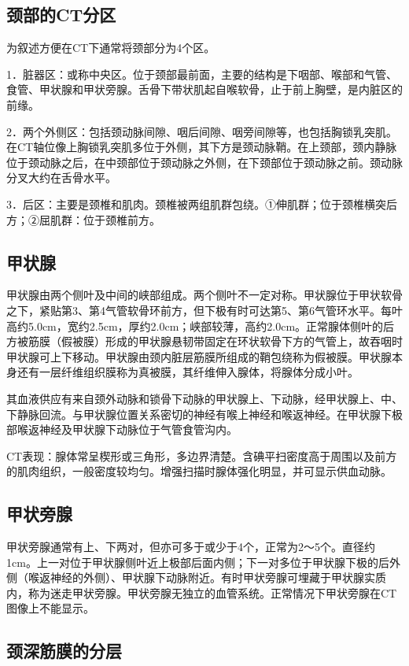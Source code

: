 \subsection{颈部的CT分区}

为叙述方便在CT下通常将颈部分为4个区。

1．脏器区：或称中央区。位于颈部最前面，主要的结构是下咽部、喉部和气管、食管、甲状腺和甲状旁腺。舌骨下带状肌起自喉软骨，止于前上胸壁，是内脏区的前缘。

2．两个外侧区：包括颈动脉间隙、咽后间隙、咽旁间隙等，也包括胸锁乳突肌。在CT轴位像上胸锁乳突肌多位于外侧，其下方是颈动脉鞘。在上颈部，颈内静脉位于颈动脉之后，在中颈部位于颈动脉之外侧，在下颈部位于颈动脉之前。颈动脉分叉大约在舌骨水平。

3．后区：主要是颈椎和肌肉。颈椎被两组肌群包绕。①伸肌群；位于颈椎横突后方；②屈肌群：位于颈椎前方。

\subsection{甲状腺}

甲状腺由两个侧叶及中间的峡部组成。两个侧叶不一定对称。甲状腺位于甲状软骨之下，紧贴第3、第4气管软骨环前方，但下极有时可达第5、第6气管环水平。每叶高约5.0cm，宽约2.5cm，厚约2.0cm；峡部较薄，高约2.0cm。正常腺体侧叶的后方被筋膜（假被膜）形成的甲状腺悬韧带固定在环状软骨下方的气管上，故吞咽时甲状腺可上下移动。甲状腺由颈内脏层筋膜所组成的鞘包绕称为假被膜。甲状腺本身还有一层纤维组织膜称为真被膜，其纤维伸入腺体，将腺体分成小叶。

其血液供应有来自颈外动脉和锁骨下动脉的甲状腺上、下动脉，经甲状腺上、中、下静脉回流。与甲状腺位置关系密切的神经有喉上神经和喉返神经。在甲状腺下极部喉返神经及甲状腺下动脉位于气管食管沟内。

CT表现：腺体常呈楔形或三角形，多边界清楚。含碘平扫密度高于周围以及前方的肌肉组织，一般密度较均匀。增强扫描时腺体强化明显，并可显示供血动脉。

\subsection{甲状旁腺}

甲状旁腺通常有上、下两对，但亦可多于或少于4个，正常为2～5个。直径约1cm。上一对位于甲状腺侧叶近上极部后面内侧；下一对多位于甲状腺下极的后外侧（喉返神经的外侧）、甲状腺下动脉附近。有时甲状旁腺可埋藏于甲状腺实质内，称为迷走甲状旁腺。甲状旁腺无独立的血管系统。正常情况下甲状旁腺在CT图像上不能显示。

\subsection{颈深筋膜的分层}

